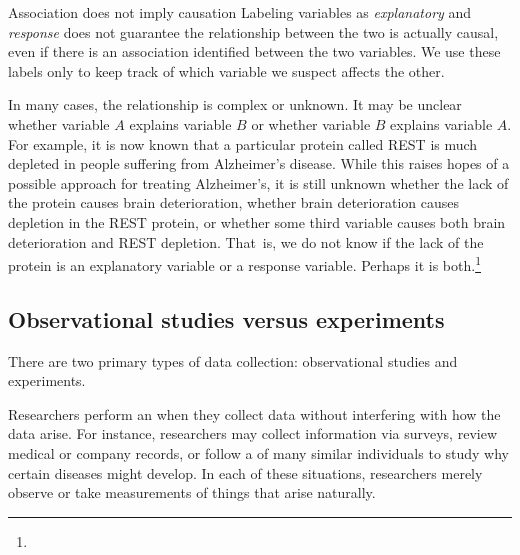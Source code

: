 \begin{onebox}{Association does not imply causation}
{Labeling variables as \emph{explanatory} and \emph{response} does not guarantee the relationship between the two is actually causal, even if there is an association identified between the two variables. We use these labels only to keep track of which variable we suspect affects the other.}
\end{onebox}

In many cases, the relationship is complex or unknown. It may be unclear whether variable $A$ explains variable $B$ or whether variable $B$ explains variable $A$. For example, it is now known that a particular protein called REST is much depleted in people suffering from Alzheimer's disease. While this raises hopes of a possible approach for treating Alzheimer's, it is still unknown whether the lack of the protein causes brain deterioration, whether brain deterioration causes depletion in the REST protein, or whether some third variable causes both brain deterioration and REST depletion. That~is, we do not know if the lack of the protein is an explanatory variable or a response variable. Perhaps it is both.\footnote{}



\D{\newpage}
\subsection{Observational studies versus experiments}

\noindent There are two primary types of data collection: observational studies and experiments.

Researchers perform an  when they collect data without interfering with how the data arise. For instance, researchers may collect information via surveys, review medical or company records, or follow a  of many similar individuals to study why certain diseases might develop. In each of these situations, researchers merely observe or take measurements of things that arise naturally.

